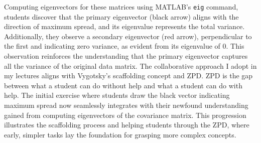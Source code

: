 \documentclass{article}
\begin{document}
Computing eigenvectors for these matrices using MATLAB's \texttt{eig} command, students discover that the primary eigenvector (black arrow) aligns with the direction of maximum spread, and its eigenvalue represents the total variance. 
Additionally, they observe a secondary eigenvector (red arrow), perpendicular to the first and indicating zero variance, as evident from its eigenvalue of 0. 
This observation reinforces the understanding that the primary eigenvector captures all the variance of the original data matrix.
The collaborative approach I adopt in my lectures aligns with Vygotsky's scaffolding concept and ZPD.
ZPD is the gap between what a student can do without help and what a student can do with help. 
The initial exercise where students draw the black vector indicating maximum spread now seamlessly integrates with their newfound understanding gained from computing eigenvectors of the covariance matrix. 
This progression illustrates the scaffolding process and helping students through the ZPD, where early, simpler tasks lay the foundation for grasping more complex concepts.
\end{document}
